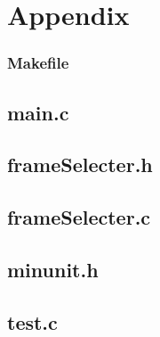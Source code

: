 \section{Appendix}

\subsubsection*{Makefile}

\pagebreak

\subsection*{main.c}

\pagebreak

\subsection*{frameSelecter.h}

\pagebreak

\subsection*{frameSelecter.c}

\pagebreak

\subsection*{minunit.h}

\pagebreak

\subsection*{test.c}

\pagebreak